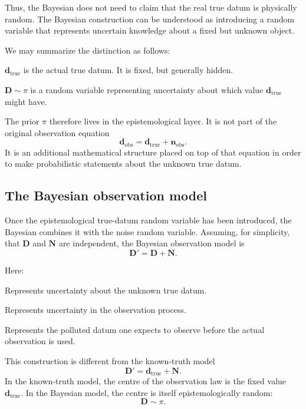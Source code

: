 \documentclass[11pt]{article}
\newcommand{\prior}{\pi}
\newcommand{\Drand}{\mathbf D}
\newcommand{\Dobsrand}{\mathbf D'}
\newcommand{\Nrand}{\mathbf N}
\newcommand{\dtrue}{\mathbf d_{\mathrm{true}}}
\newcommand{\dobs}{\mathbf d_{\mathrm{obs}}}
\newcommand{\nobs}{\mathbf n_{\mathrm{obs}}}
\begin{document}
Thus, the Bayesian does not need to claim that the real true datum is physically random. The Bayesian construction can be understood as introducing a random variable that represents uncertain knowledge about a fixed but unknown object.

We may summarize the distinction as follows:
\begin{description}[leftmargin=3.1cm,style=nextline]
    \item[Ontological true datum.]
    \(\dtrue\) is the actual true datum. It is fixed, but generally hidden.

    \item[Epistemological true datum.]
    \(\Drand\sim\prior\) is a random variable representing uncertainty about which value \(\dtrue\) might have.
\end{description}

The prior \(\prior\) therefore lives in the epistemological layer. It is not part of the original observation equation
\[
    \dobs=\dtrue+\nobs.
\]
It is an additional mathematical structure placed on top of that equation in order to make probabilistic statements about the unknown true datum.

\subsection{The Bayesian observation model}

Once the epistemological true-datum random variable has been introduced, the Bayesian combines it with the noise random variable. Assuming, for simplicity, that \(\Drand\) and \(\Nrand\) are independent, the Bayesian observation model is
\[
    \Dobsrand=\Drand+\Nrand.
\]

Here:
\begin{description}[leftmargin=2.8cm,style=nextline]
    \item[\(\Drand\).]
    Represents uncertainty about the unknown true datum.

    \item[\(\Nrand\).]
    Represents uncertainty in the observation process.

    \item[\(\Dobsrand\).]
    Represents the polluted datum one expects to observe before the actual observation is used.
\end{description}

This construction is different from the known-truth model
\[
    \Dobsrand=\dtrue+\Nrand.
\]
In the known-truth model, the centre of the observation law is the fixed value \(\dtrue\). In the Bayesian model, the centre is itself epistemologically random:
\[
    \Drand\sim\prior.
\]
\end{document}
